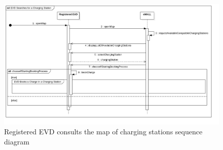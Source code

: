 \begin{center}
    \begin{figure} [H]
        \begin{center}
            \includegraphics[width=0.9\linewidth]{Images/SequenceDiagrams/evd_searches_for_a_charging_station}
            \caption{Registered EVD consults the map of charging stations sequence diagram}
            \label{fig: evd_consults_stations_seq_diag}
        \end{center}
    \end{figure}
\end{center}

